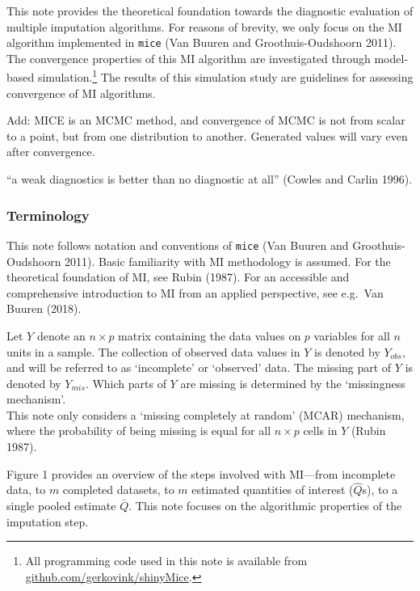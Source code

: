 \documentclass[
  Royal, times, sageapa]{sagej}
\begin{document}
This note provides the theoretical foundation towards the diagnostic
evaluation of multiple imputation algorithms. For reasons of brevity, we
only focus on the MI algorithm implemented in \texttt{mice} (Van Buuren
and Groothuis-Oudshoorn 2011). The convergence properties of this MI
algorithm are investigated through model-based simulation.\footnote{All
  programming code used in this note is available from
  \href{https://github.com/gerkovink/shinyMice/tree/master/3.Thesis/1.SimulationStudy}{github.com/gerkovink/shinyMice}.}
The results of this simulation study are guidelines for assessing
convergence of MI algorithms.

Add: MICE is an MCMC method, and convergence of MCMC is not from scalar
to a point, but from one distribution to another. Generated values will
vary even after convergence.

``a weak diagnostics is better than no diagnostic at all'' (Cowles and
Carlin 1996).

\hypertarget{terminology}{%
\subsubsection{Terminology}\label{terminology}}

This note follows notation and conventions of \texttt{mice} (Van Buuren
and Groothuis-Oudshoorn 2011). Basic familiarity with MI methodology is
assumed. For the theoretical foundation of MI, see Rubin (1987). For an
accessible and comprehensive introduction to MI from an applied
perspective, see e.g.~Van Buuren (2018).

Let \(Y\) denote an \(n \times p\) matrix containing the data values on
\(p\) variables for all \(n\) units in a sample. The collection of
observed data values in \(Y\) is denoted by \(Y_{obs}\), and will be
referred to as `incomplete' or `observed' data. The missing part of
\(Y\) is denoted by \(Y_{mis}\). Which parts of \(Y\) are missing is
determined by the `missingness mechanism'.\\
This note only considers a `missing completely at random' (MCAR)
mechanism, where the probability of being missing is equal for all
\(n \times p\) cells in \(Y\) (Rubin 1987).

Figure 1 provides an overview of the steps involved with MI---from
incomplete data, to \(m\) completed datasets, to \(m\) estimated
quantities of interest (\(\hat{Q}\)s), to a single pooled estimate
\(\bar{Q}\). This note focuses on the algorithmic properties of the
imputation step.
\end{document}
